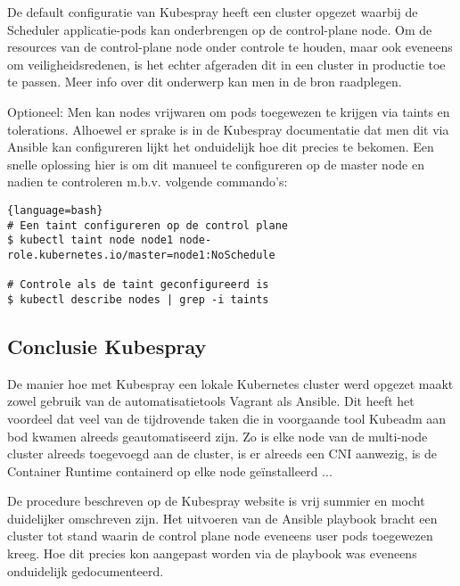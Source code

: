 De default configuratie van Kubespray heeft een cluster opgezet waarbij de Scheduler applicatie-pods kan onderbrengen op de control-plane node. Om de resources van de control-plane node onder controle te houden, maar ook eveneens om veiligheidsredenen, is het echter afgeraden dit in een cluster in productie toe te passen. Meer info over dit onderwerp kan men in de bron raadplegen. \autocite{Bailey2016}

Optioneel: Men kan nodes vrijwaren om pods toegewezen te krijgen via taints en tolerations. Alhoewel er sprake is in de Kubespray documentatie dat men dit via Ansible kan configureren lijkt het onduidelijk hoe dit precies te bekomen. \autocite{Kubespray2022b}
Een snelle oplossing hier is om dit manueel te configureren op de master node en nadien te controleren m.b.v. volgende commando's: 
\begin{lstlisting}{language=bash}
# Een taint configureren op de control plane
$ kubectl taint node node1 node-role.kubernetes.io/master=node1:NoSchedule

# Controle als de taint geconfigureerd is
$ kubectl describe nodes | grep -i taints
\end{lstlisting}

\subsection{Conclusie Kubespray}

De manier hoe met Kubespray een lokale Kubernetes cluster werd opgezet maakt zowel gebruik van de automatisatietools Vagrant als Ansible. Dit heeft het voordeel dat veel van de tijdrovende taken die in voorgaande tool Kubeadm aan bod kwamen alreeds geautomatiseerd zijn. Zo is elke node van de multi-node cluster alreeds toegevoegd aan de cluster, is er alreeds een CNI aanwezig, is de Container Runtime containerd op elke node geïnstalleerd ...

De procedure beschreven op de Kubespray website is vrij summier en mocht duidelijker omschreven zijn. Het uitvoeren van de Ansible playbook bracht een cluster tot stand waarin de control plane node eveneens user pods toegewezen kreeg. Hoe dit precies kon aangepast worden via de playbook was eveneens onduidelijk gedocumenteerd. 